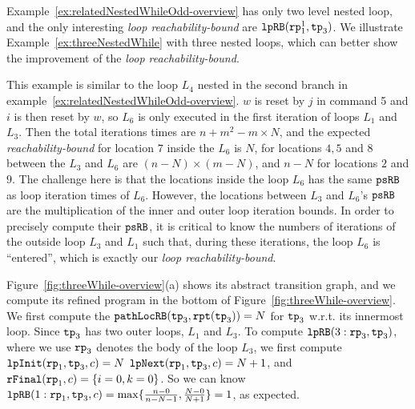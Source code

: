 Example~\ref{ex:relatedNestedWhileOdd-overview} has only two level nested loop, and
the only interesting \emph{loop reachability-bound} are $\mathtt{lpRB}(\mathtt{rp}_1^1, \mathtt{tp}_3)$.
We illustrate Example~\ref{ex:threeNestedWhile} with three nested loops, which can better show the improvement of the \emph{loop reachability-bound}.
\begin{example}
  \label{ex:threeNestedWhile}

This example is similar to the loop $L_4$ nested in the second branch in example~\ref{ex:relatedNestedWhileOdd-overview}.
$w$ is reset by $j$ in command 5 and $i$ is then reset by $w$, so $L_6$ is only executed in the first iteration of loops $L_1$ and $L_3$.
Then the total iterations times are
$n + m^2 - m \times N$,
and the expected \emph{reachability-bound} for location $7$ inside the $L_6$ is $N$,
for locations $4, 5$ and $8$ between the $L_3$ and $L_6$ are $(n-N) \times (m - N)$,
and $n - N$ for locations $2$ and $9$.
The challenge here is that the locations inside the loop $L_6$ has the same
$\mathtt{psRB}$ as loop iteration times of $L_6$.
However, the locations between $L_3$ and $L_6$'s $\mathtt{psRB}$ are the multiplication of the inner and outer loop iteration bounds.
In order to precisely compute their $\mathtt{psRB}$, it is critical to know
the numbers of iterations of the outside loop $L_3$ and $L_1$ such that,
during these iterations, the loop $L_6$ is ``entered'', which is exactly our \emph{loop reachability-bound}.

Figure~\ref{fig:threeWhile-overview}(a) shows its abstract transition graph,
and we compute its refined program in the bottom of Figure~\ref{fig:threeWhile-overview}. 
We first compute the $\mathtt{pathLocRB}(\mathtt{tp}_3, \mathtt{rpt}(\mathtt{tp}_3)) = N $ for $\mathtt{tp}_3$ w.r.t. its innermost loop.
Since $\mathtt{tp}_3$ has two outer loops, $L_1$ and $L_3$.
To compute $\mathtt{lpRB}(3: \mathtt{rp}_3, \mathtt{tp}_3)$, where we use $\mathtt{rp}_3$ denotes the body of the loop $L_3$,
we first compute $\mathtt{lpInit}( \mathtt{rp}_1, \mathtt{tp}_3, c) = N$
$\mathtt{lpNext}( \mathtt{rp}_1, \mathtt{tp}_3, c) =  N + 1 $, and
$\mathtt{rFinal}(\mathtt{rp}_1, c) = \{ i = 0, k = 0 \}$.
So we can know $\mathtt{lpRB}(1: \mathtt{rp}_1, \mathtt{tp}_3, c) = \max\{ \frac{n - 0}{n - N - 1}, \frac{N - 0}{N +  1}\} = 1$, as expected.
\end{example}
